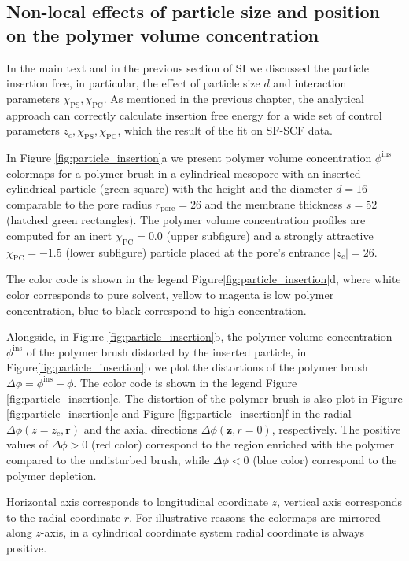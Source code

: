 \documentclass[10pt, a4paper]{article}
\begin{document}
\subsection*{Non-local effects of particle size and position on the polymer volume concentration}
\begin{multicols}{2}
In the main text and in the previous section of SI we discussed the particle insertion free, in particular, the effect of particle size $d$ and interaction parameters $\chi_{\textrm{PS}}, \chi_{\textrm{PC}}$.
As mentioned in the previous chapter, the analytical approach can correctly calculate insertion free energy for a wide set of control parameters $z_c, \chi_{\textrm{PS}}, \chi_{\textrm{PC}}$, which the result of the fit on SF-SCF data.

In Figure \ref{fig:particle_insertion}a we present polymer volume concentration $\phi^{\textrm{ins}}$ colormaps for a polymer brush in a cylindrical mesopore with an inserted cylindrical particle (green square) with the height and the diameter $d=16$ comparable to the pore radius $r_{\textrm{pore}}=26$ and the membrane thickness $s=52$ (hatched green rectangles).
The polymer volume concentration profiles are computed for an inert $\chi_{\textrm{PC}} = 0.0$ (upper subfigure) and a strongly attractive $\chi_{\textrm{PC}} = -1.5$ (lower subfigure) particle placed at the pore's entrance $|z_c| = 26$.

The color code is shown in the legend Figure\ref{fig:particle_insertion}d, where white color corresponds to pure solvent, yellow to magenta is low polymer concentration, blue to black correspond to high concentration.

Alongside, in Figure \ref{fig:particle_insertion}b, the polymer volume concentration $\phi^{\textrm{ins}}$ of the polymer brush distorted by the inserted particle, in Figure\ref{fig:particle_insertion}b we plot the distortions of the polymer brush $\Delta \phi = \phi^{\textrm{ins}} - \phi$.
The color code is shown in the legend Figure \ref{fig:particle_insertion}e.
The distortion of the polymer brush is also plot in Figure \ref{fig:particle_insertion}c and Figure \ref{fig:particle_insertion}f in the radial $\Delta \phi(z=z_c, \bm{r})$ and the axial directions $\Delta \phi(\bm{z}, r=0)$, 
respectively.
The positive values of $\Delta \phi > 0$ (red color) correspond to the region enriched with the polymer compared to the undisturbed brush, while $\Delta \phi < 0$ (blue color) correspond to the polymer depletion.

Horizontal axis corresponds to longitudinal coordinate $z$, vertical axis corresponds to the radial coordinate $r$.
For illustrative reasons the colormaps are mirrored along $z$-axis, in a cylindrical coordinate system radial coordinate is always positive.


\end{multicols}
\end{document}
